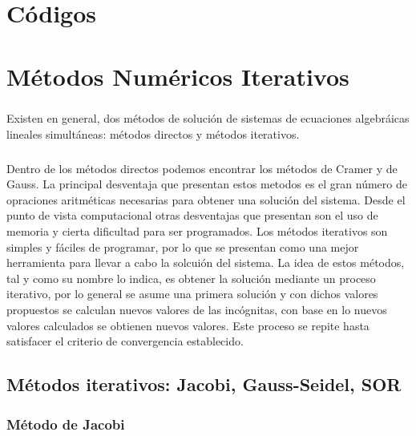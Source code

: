 \documentclass[letterpaper, openright, 12pt]{book}
\begin{document}
%
%
%
%
%

%
%
%
%
%
\appendix
\chapter{Códigos}\label{appCode}

%
%
%
%
%

%
%
%
%
%
\chapter{Métodos Numéricos Iterativos}\label{appIter}
    \paragraph*{}
        Existen en general, dos métodos de solución de sistemas de ecuaciones
        algebráicas lineales simultáneas: métodos directos y métodos iterativos.

    \paragraph*{}
        Dentro de los métodos directos podemos encontrar los métodos de Cramer y
        de Gauss. La principal desventaja que presentan estos metodos es el gran
        número de opraciones aritméticas necesarias para obtener una solución
        del sistema. Desde el punto de vista computacional otras desventajas que
        presentan son el uso de memoria y cierta dificultad para ser programados.
        Los métodos iterativos son simples y fáciles de programar, por lo que se
        presentan como una mejor herramienta para llevar a cabo la solcuión del
        sistema. La idea de estos métodos, tal y como su nombre lo indica, es
        obtener la solución mediante un proceso iterativo, por lo general se
        asume una primera solución y con dichos valores propuestos se calculan
        nuevos valores de las incógnitas, con base en lo nuevos valores
        calculados se obtienen nuevos valores. Este proceso se repite hasta
        satisfacer el criterio de convergencia establecido.

    \section{Métodos iterativos: Jacobi, Gauss-Seidel, SOR}
    \subsection{Método de Jacobi}
\end{document}
